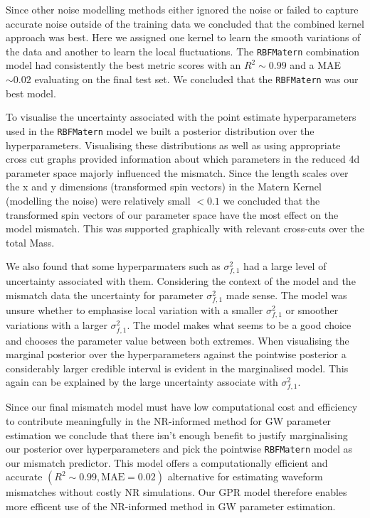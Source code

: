\documentclass{ucdgradtaughtthesis}
\begin{document}
Since other noise modelling methods either ignored the noise or failed to capture accurate noise outside of the training data we concluded that the combined kernel approach
was best. Here we assigned one kernel to learn the smooth variations of the data and another to learn the local fluctuations.
The \texttt{RBFMatern} combination model had consistently the best metric scores with an \(R^2 \sim 0.99\) and a MAE \(\sim 0.02\) evaluating on the final test set.
We concluded that the \texttt{RBFMatern} was our best model.
%

To visualise the uncertainty associated with the point estimate hyperparameters used in the
\texttt{RBFMatern} model we built a posterior distribution over the hyperparameters. Visualising these distributions as well as
using appropriate cross cut graphs provided information about which parameters in the reduced 4d parameter space majorly influenced the mismatch.
Since the length scales over the x and y dimensions (transformed spin vectors) in the Matern Kernel (modelling the noise) were relatively small \(<0.1\)
we concluded that the transformed spin vectors of our parameter space have the most effect on the model mismatch. This was supported graphically with relevant cross-cuts
over the total Mass.
% 

We also found that some hyperparmaters such as \(\sigma_{f,1}^2\) 
had a large level of uncertainty associated with them. Considering the context of the model and the mismatch data the uncertainty for parameter \(\sigma_{f,1}^2\) made sense. 
The model was unsure whether to emphasise local variation with a smaller \(\sigma_{f,1}^2\) or smoother variations with a larger \(\sigma_{f,1}^2\).
The model makes what seems to be a good choice and chooses the parameter value between both extremes. When visualising the marginal posterior over the hyperparameters against the
pointwise posterior a considerably larger credible interval is evident in the marginalised model. This again can be explained by the large uncertainty associate with
\(\sigma_{f,1}^2\). 
%

Since our final mismatch model must have low computational cost and efficiency to contribute meaningfully in the NR-informed method for GW parameter estimation we conclude that there isn't
enough benefit to justify marginalising our posterior over hyperparameters and pick the pointwise \texttt{RBFMatern} model as our mismatch predictor.
This model offers a computationally efficient and accurate \((R^2 \sim 0.99, \text{MAE}=0.02)\) alternative
for estimating waveform mismatches without costly NR simulations. Our GPR model therefore enables more efficent use of the NR-informed method in GW parameter estimation.
\end{document}
